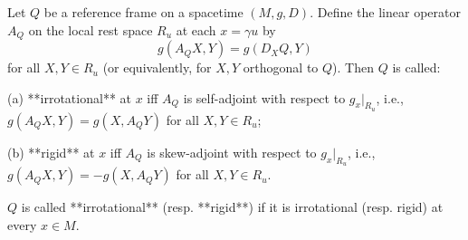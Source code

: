 Let $Q$ be a reference frame on a spacetime $(M, g, D)$. Define the linear operator $A_Q$ on the local rest space $R_u$ at each $x = \gamma u$ by
$$g(A_Q X, Y) = g(D_X Q, Y)$$
for all $X, Y \in R_u$ (or equivalently, for $X, Y$ orthogonal to $Q$). Then $Q$ is called:

(a) **irrotational** at $x$ iff $A_Q$ is self-adjoint with respect to $g_x|_{R_u}$, i.e., $g(A_Q X, Y) = g(X, A_Q Y)$ for all $X, Y \in R_u$;

(b) **rigid** at $x$ iff $A_Q$ is skew-adjoint with respect to $g_x|_{R_u}$, i.e., $g(A_Q X, Y) = -g(X, A_Q Y)$ for all $X, Y \in R_u$.

$Q$ is called **irrotational** (resp. **rigid**) if it is irrotational (resp. rigid) at every $x \in M$.
